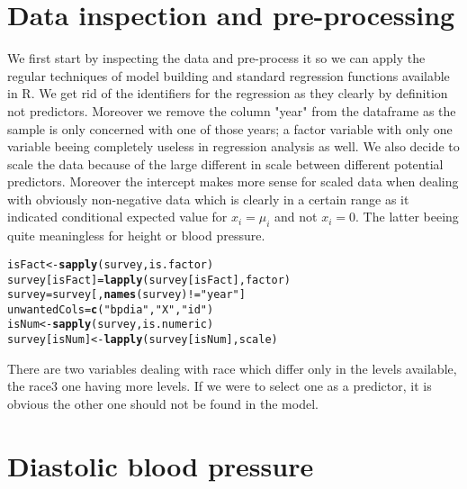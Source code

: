 \documentclass{article}\usepackage[]{graphicx}\usepackage[]{color}
\makeatletter
\newcommand{\hlstr}[1]{\textcolor[rgb]{0.192,0.494,0.8}{#1}}%
\newcommand{\hlopt}[1]{\textcolor[rgb]{0,0,0}{#1}}%
\newcommand{\hlstd}[1]{\textcolor[rgb]{0.345,0.345,0.345}{#1}}%
\newcommand{\hlkwb}[1]{\textcolor[rgb]{0.69,0.353,0.396}{#1}}%
\newcommand{\hlkwd}[1]{\textcolor[rgb]{0.737,0.353,0.396}{\textbf{#1}}}%
\newenvironment{kframe}{%
 \def\at@end@of@kframe{}%
 \ifinner\ifhmode%
  \def\at@end@of@kframe{\end{minipage}}%
  \begin{minipage}{\columnwidth}%
 \fi\fi%
 \def\FrameCommand##1{\hskip\@totalleftmargin \hskip-\fboxsep
 \colorbox{shadecolor}{##1}\hskip-\fboxsep
     \hskip-\linewidth \hskip-\@totalleftmargin \hskip\columnwidth}%
 \MakeFramed {\advance\hsize-\width
   \@totalleftmargin\z@ \linewidth\hsize
   \@setminipage}}%
 {\par\unskip\endMakeFramed%
 \at@end@of@kframe}
\newenvironment{knitrout}{}{} %
\makeatother
\begin{document}
\clearpage

\section{Data inspection and pre-processing}

We first start by inspecting the data and pre-process it so we can apply the regular techniques of model building and standard regression functions available in R. We get rid of the identifiers for the regression as they clearly by definition not predictors. Moreover we remove the column "year" from the dataframe as the sample is only concerned with one of those years; a factor variable with only one variable beeing completely useless in regression analysis as well. We also decide to scale the data because of the large different in scale between different potential predictors. Moreover the intercept makes more sense for scaled data when dealing with obviously non-negative data which is clearly in a certain range as it indicated conditional expected value for $x_i = \mu _i$ and not $x_i = 0$. The latter beeing quite meaningless for height or blood pressure. 

\begin{knitrout}
\color{fgcolor}\begin{kframe}
\begin{alltt}
\hlstd{isFact} \hlkwb{<-} \hlkwd{sapply}\hlstd{(survey, is.factor)}
\hlstd{survey[isFact]} \hlkwb{=} \hlkwd{lapply}\hlstd{(survey[isFact],factor)}
\hlstd{survey} \hlkwb{=} \hlstd{survey[,} \hlkwd{names}\hlstd{(survey)} \hlopt{!=} \hlstr{"year"}\hlstd{]}
\hlstd{unwantedCols} \hlkwb{=} \hlkwd{c}\hlstd{(}\hlstr{"bpdia"}\hlstd{,}\hlstr{"X"}\hlstd{,}\hlstr{"id"}\hlstd{)}
\hlstd{isNum} \hlkwb{<-} \hlkwd{sapply}\hlstd{(survey, is.numeric)}
\hlstd{survey[isNum]} \hlkwb{<-} \hlkwd{lapply}\hlstd{(survey[isNum], scale)}
\end{alltt}
\end{kframe}
\end{knitrout}
There are two variables dealing with race which differ only in the levels available, the race3 one having more levels. If we were to select one as a predictor, it is obvious the other one should not be found in the model.

\clearpage




\section{Diastolic blood pressure}
\end{document}

